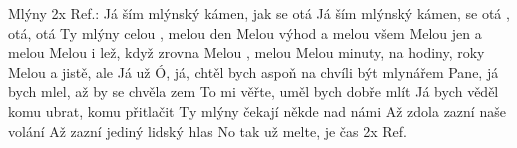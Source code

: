 \begin{TEXT}{Mlýny}
\REFREN 2x Ref.: \NL
Já ším mlýnský kámen, jak se otá\NL
Já ším mlýnský kámen,  se otá\NL
{}, otá, otá
\SLOKA Ty mlýny  celou , melou  den\NL
Melou  výhod a melou  všem\NL
Melou  jen a melou \NL
Melou  i lež, když zrovna \NL
Melou , melou \NL
Melou  minuty, na hodiny,  roky\NL
Melou  a jistě, ale  \NL
Já už   
\REFRENHRAJ
\SLOKA Ó, já, chtěl bych aspoň na chvíli být mlynářem\NL
Pane, já bych mlel, až by se chvěla zem\NL
To mi věřte, uměl bych dobře mlít\NL
Já bych věděl komu ubrat, komu přitlačit\NL
Ty mlýny čekají někde nad námi\NL
Až zdola zazní naše volání\NL
Až zazní jediný lidský hlas\NL
No tak už melte, je čas\NL
\REFREN 2x Ref.
\end{TEXT}
